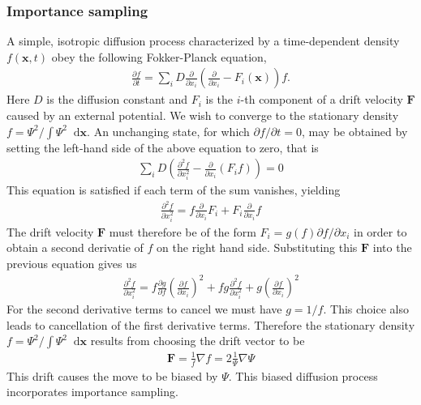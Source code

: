 \documentclass[twoside,english]{uiofysmaster}
\newcommand*\dif{\mathop{}\!\mathrm{d}}
\begin{document}
\subsubsection{Importance sampling}
A simple, isotropic diffusion process characterized by a time-dependent density $f(\bm{x}, t)$ obey the following Fokker-Planck equation,
\begin{align}
	\frac{\partial f}{\partial t} = \sum_i D \frac{\partial}{\partial x_i} ( \frac{\partial}{\partial x_i} - F_i(\bm{x}) ) f .
\end{align}
Here $D$ is the diffusion constant and $F_i$ is the $i$-th component of a drift velocity $\bm{F}$ caused by an external potential. We wish to converge to the stationary density $f = \Psi^2 / \int \Psi^2 \dif \bm{x}$. An unchanging state, for which $\partial f / \partial t = 0$, may be obtained by setting the left-hand side of the above equation to zero, that is
\begin{align}
	\sum_i D(\frac{\partial^2 f}{\partial x_i^2} - \frac{\partial}{\partial x_i} (F_i f)  ) = 0
\end{align}
This equation is satisfied if each term of the sum vanishes, yielding
\begin{align}
	\frac{\partial^2 f}{\partial x_i^2} = f \frac{\partial}{\partial x_i} F_i + F_i \frac{\partial}{\partial x_i} f
\end{align}
The drift velocity $\bm{F}$ must therefore be of the form $F_i = g(f) \partial f/ \partial x_i$ in order to obtain a second derivatie of $f$ on the right hand side. Substituting this $\bm{F}$ into the previous equation gives us
\begin{align}
	\frac{\partial^2 f}{\partial x_i^2} = f \frac{\partial g}{\partial f} (\frac{\partial f}{\partial x_i})^2
	+ f g \frac{\partial^2 f}{\partial x_i^2} + g (\frac{\partial f}{\partial x_i})^2
\end{align}
For the second derivative terms to cancel we must have $g = 1/f$. This choice also leads to cancellation of the first derivative terms. Therefore the stationary density $f = \Psi^2 / \int \Psi^2 \dif \bm{x}$ results from choosing the drift vector to be
\begin{align}
	\bm{F} = \frac{1}{f} \nabla f = 2 \frac{1}{\Psi} \nabla \Psi
\end{align}
This drift causes the move to be biased by $\Psi$. This biased diffusion process incorporates importance sampling.
\end{document}

